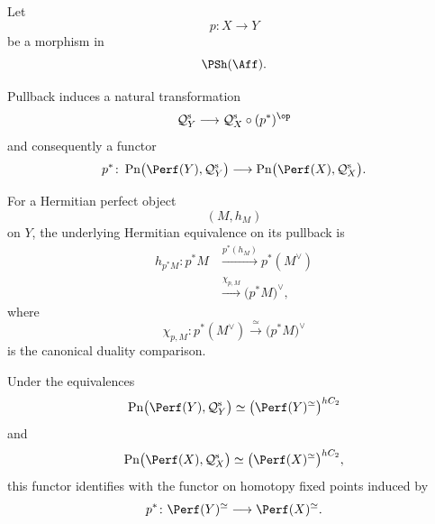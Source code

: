 \begin{proposition}
\label{prop:pullback-hermitian-perfect-objects}
Let
\[
    p
    \colon
    X
    \longrightarrow
    Y
\]
be a morphism in
\[
    \PSh(\Aff).
\]

Pullback induces a natural transformation
\[
    \mathcal Q_Y^{\mathrm s}
    \longrightarrow
    \mathcal Q_X^{\mathrm s}
    \circ
    (p^*)^{\op}
\]
and consequently a functor
\[
    p^*
    \colon
    \operatorname{Pn}
    \bigl(
        \Perf(Y),
        \mathcal Q_Y^{\mathrm s}
    \bigr)
    \longrightarrow
    \operatorname{Pn}
    \bigl(
        \Perf(X),
        \mathcal Q_X^{\mathrm s}
    \bigr).
\]

For a Hermitian perfect object
\[
    (M,h_M)
\]
on $Y$, the underlying Hermitian equivalence on its pullback is
\[
\begin{aligned}
    h_{p^*M}
    \colon
    p^*M
    &\xrightarrow{p^*(h_M)}
    p^*(M^\vee)
    \\
    &\xrightarrow{\chi_{p,M}}
    \bigl(p^*M\bigr)^\vee,
\end{aligned}
\]
where
\[
    \chi_{p,M}
    \colon
    p^*(M^\vee)
    \xrightarrow{\;\simeq\;}
    \bigl(p^*M\bigr)^\vee
\]
is the canonical duality comparison.

Under the equivalences
\[
    \operatorname{Pn}
    \bigl(
        \Perf(Y),
        \mathcal Q_Y^{\mathrm s}
    \bigr)
    \simeq
    \bigl(
        \Perf(Y)^\simeq
    \bigr)^{hC_2}
\]
and
\[
    \operatorname{Pn}
    \bigl(
        \Perf(X),
        \mathcal Q_X^{\mathrm s}
    \bigr)
    \simeq
    \bigl(
        \Perf(X)^\simeq
    \bigr)^{hC_2},
\]
this functor identifies with the functor on homotopy fixed points induced
by
\[
    p^*
    \colon
    \Perf(Y)^\simeq
    \longrightarrow
    \Perf(X)^\simeq.
\]
\end{proposition}

